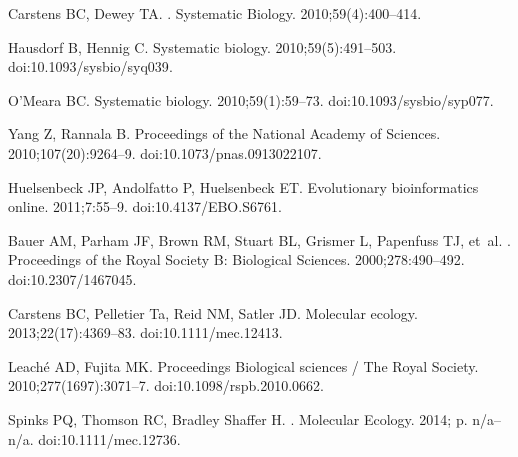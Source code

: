 \documentclass[10pt,letterpaper]{article}
\begin{document}
\begin{thebibliography}{10}
    Carstens BC, Dewey TA.
    .
    \newblock Systematic Biology. 2010;59(4):400--414.

    Hausdorf B, Hennig C.
\newblock Systematic biology. 2010;59(5):491--503.
\newblock doi:{10.1093/sysbio/syq039}.

  O'Meara BC.
\newblock Systematic biology. 2010;59(1):59--73.
\newblock doi:{10.1093/sysbio/syp077}.

  Yang Z, Rannala B.
\newblock Proceedings of the National Academy of Sciences.
  2010;107(20):9264--9.
\newblock doi:{10.1073/pnas.0913022107}.

  Huelsenbeck JP, Andolfatto P, Huelsenbeck ET.
\newblock Evolutionary bioinformatics online. 2011;7:55--9.
\newblock doi:{10.4137/EBO.S6761}.

  Bauer AM, Parham JF, Brown RM, Stuart BL, Grismer L, Papenfuss TJ, et~al.
.
\newblock Proceedings of the Royal Society B: Biological Sciences.
  2000;278:490--492.
\newblock doi:{10.2307/1467045}.

  Carstens BC, Pelletier Ta, Reid NM, Satler JD.
\newblock Molecular ecology. 2013;22(17):4369--83.
\newblock doi:{10.1111/mec.12413}.

  Leach{\'{e}} AD, Fujita MK.
\newblock Proceedings Biological sciences / The Royal Society.
  2010;277(1697):3071--7.
\newblock doi:{10.1098/rspb.2010.0662}.

  Spinks PQ, Thomson RC, {Bradley Shaffer} H.
.
\newblock Molecular Ecology. 2014; p. n/a--n/a.
\newblock doi:{10.1111/mec.12736}.


\end{thebibliography}
\end{document}
